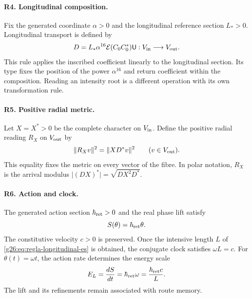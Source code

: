 \paragraph{R4. Longitudinal composition.}
Fix the generated coordinate \(\alpha>0\) and the longitudinal reference section \(L_*>0\). Longitudinal transport is defined by
\begin{equation}
 D=L_*\alpha^{16}\mathcal E(C_0C_0^*)\mathsf U:
 V_{\rm in}\longrightarrow V_{\rm out}.
 \label{g26:eq:regla-longitudinal-es}
\end{equation}
This rule applies the inscribed coefficient linearly to the longitudinal section. Its type fixes the position of the power \(\alpha^{16}\) and return coefficient within the composition. Reading an intensity root is a different operation with its own transformation rule.

\paragraph{R5. Positive radial metric.}
Let \(X=X^*>0\) be the complete character on \(V_{\rm in}\). Define the positive radial reading \(R_X\) on \(V_{\rm out}\) by
\begin{equation}
 \|R_Xv\|^2=\|XD^*v\|^2
 \qquad(v\in V_{\rm out}).
 \label{g26:eq:metrica-radial-es}
\end{equation}
This equality fixes the metric on every vector of the fibre. In polar notation, \(R_X\) is the arrival modulus \(\lvert(DX)^*\rvert=\sqrt{DX^2D^*}\).

\paragraph{R6. Action and clock.}
The generated action section \(\hbar_{\rm ret}>0\) and the real phase lift satisfy
\begin{equation}
 S(\theta)=\hbar_{\rm ret}\theta.
 \label{g26:eq:accion-fase-es}
\end{equation}
The constitutive velocity \(c>0\) is preserved. Once the intensive length \(L\) of \eqref{g26:eq:regla-longitudinal-es} is obtained, the conjugate clock satisfies \(\omega L=c\). For \(\theta(t)=\omega t\), the action rate determines the energy scale
\begin{equation}
 E_{L}=\frac{dS}{dt}=\hbar_{\rm ret}\omega
   =\frac{\hbar_{\rm ret}c}{L}.
 \label{g26:eq:escala-energetica-es}
\end{equation}
The lift and its refinements remain associated with route memory.

